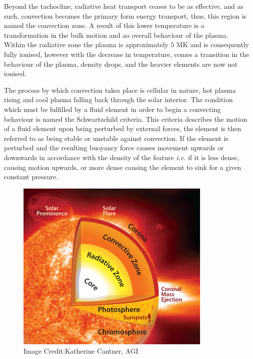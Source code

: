 Beyond the tachocline, radiative heat transport ceases to be as effective, and as such, convection becomes the primary form energy transport, thus, this region is named the convection zone. 
A result of this lower temperature is a transformation in the bulk motion and ao overall behaviour of the plasma.
Within the radiative zone the plasma is approximately $5$ MK and is consequently fully ionised, however with the decrease in temperature, comes a transition in the behaviour of the plasma, density drops, and the heavier elements are now not ionised.

The process by which convection takes place is cellular in nature, hot plasma rising and cool plasma falling back through the solar interior.
The condition which must be fulfilled by a fluid element in order to begin a convecting behaviour is named the Schwartzchild criteria.
This criteria describes the motion of a fluid element upon being perturbed by external forces, the element is then referred to as being stable or unstable against convection.
If the element is perturbed and the resulting buoyancy force causes movement upwards or downwards in accordance with the density of the feature \emph{i.e.} if it is less dense, causing motion upwards, or more dense causing the element to sink for a given constant pressure.

\begin{figure}
	\centering
	\includegraphics[width=\linewidth]{Chapter1/Figs/SolarStructure}
	\caption{Image Credit:Katherine Cantner, AGI}
\end{figure}


